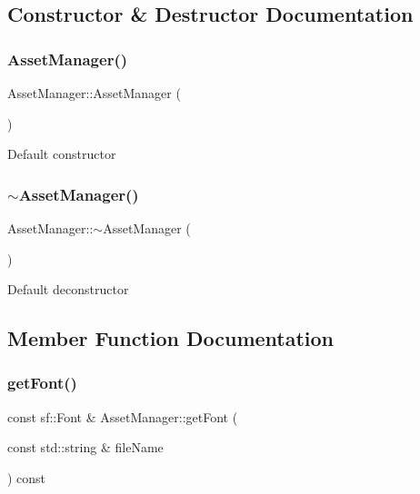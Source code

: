 \subsection{Constructor \& Destructor Documentation}
\mbox{\label{class_asset_manager_a48938b146fa7ad19270a11be5363472a}} 
\subsubsection{\texorpdfstring{AssetManager()}{AssetManager()}}
{\footnotesize\ttfamily Asset\+Manager\+::\+Asset\+Manager (\begin{DoxyParamCaption}{ }\end{DoxyParamCaption})\hspace{0.3cm}{\ttfamily [default]}}

Default constructor \mbox{\label{class_asset_manager_a4b1639accc9354ac88e9239833b519b7}} 
\subsubsection{\texorpdfstring{$\sim$AssetManager()}{~AssetManager()}}
{\footnotesize\ttfamily Asset\+Manager\+::$\sim$\+Asset\+Manager (\begin{DoxyParamCaption}{ }\end{DoxyParamCaption})\hspace{0.3cm}{\ttfamily [default]}}

Default deconstructor 

\subsection{Member Function Documentation}
\mbox{\label{class_asset_manager_a48c91cdece398df4831ffdb5b0ce9e46}} 
\subsubsection{\texorpdfstring{getFont()}{getFont()}}
{\footnotesize\ttfamily const sf\+::\+Font \& Asset\+Manager\+::get\+Font (\begin{DoxyParamCaption}\item[{const std\+::string \&}]{file\+Name }\end{DoxyParamCaption}) const}

